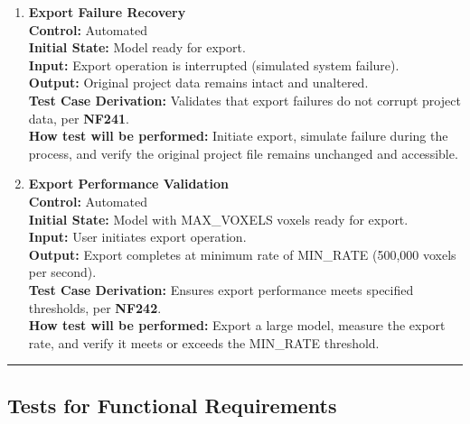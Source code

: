 \documentclass[12pt, titlepage]{article}
\begin{document}
\begin{enumerate}
  \item \textbf{Export Failure Recovery} \\[2mm]
    \textbf{Control:} Automated \\ 
    \textbf{Initial State:} Model ready for export. \\ 
    \textbf{Input:} Export operation is interrupted (simulated system failure). \\ 
    \textbf{Output:} Original project data remains intact and unaltered. \\[2mm]
    \textbf{Test Case Derivation:} Validates that export failures do not corrupt project data, per \textbf{NF241}. \\[2mm]
    \textbf{How test will be performed:} Initiate export, simulate failure during the process, and verify the original project file remains unchanged and accessible.

  \item \textbf{Export Performance Validation} \\[2mm]
    \textbf{Control:} Automated \\ 
    \textbf{Initial State:} Model with MAX\_VOXELS voxels ready for export. \\ 
    \textbf{Input:} User initiates export operation. \\ 
    \textbf{Output:} Export completes at minimum rate of MIN\_RATE (500,000 voxels per second). \\[2mm]
    \textbf{Test Case Derivation:} Ensures export performance meets specified thresholds, per \textbf{NF242}. \\[2mm]
    \textbf{How test will be performed:} Export a large model, measure the export rate, and verify it meets or exceeds the MIN\_RATE threshold.

\end{enumerate}

\noindent\rule{\textwidth}{0.5pt}

\subsection{Tests for Functional Requirements}


\end{document}
